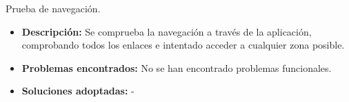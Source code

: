 \item Prueba de navegación.
  \begin{itemize}
    \item \textbf{Descripción:} Se comprueba la navegación a través de la
    aplicación, comprobando todos los enlaces e intentado acceder a cualquier
    zona posible.
    \item \textbf{Problemas encontrados:} No se han encontrado problemas
    funcionales.
    \item \textbf{Soluciones adoptadas:} -
  \end{itemize}

